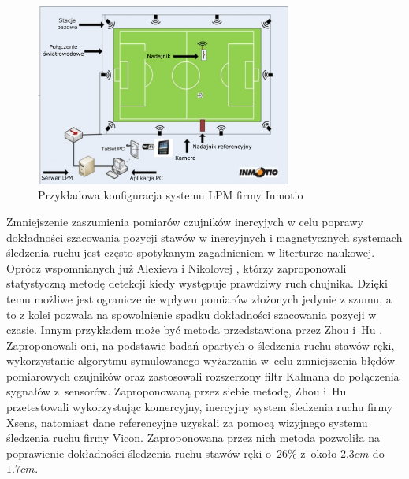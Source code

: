 \begin{savenotes}
	\begin{figure}[!htb]
		\centering	
		\includegraphics[width=0.75\textwidth]{images/lpm.png}
		\caption[Przykładowa konfiguracja systemu LPM firmy Inmotio]{Przykładowa konfiguracja systemu LPM firmy Inmotio}	
		\label{fig:literature:footnote:inmotio:setup}	
	\end{figure}
\end{savenotes}

Zmniejszenie zaszumienia pomiarów czujników inercyjych w celu poprawy dokładności szacowania pozycji stawów w inercyjnych i magnetycznych systemach śledzenia ruchu jest często spotykanym zagadnieniem w literturze naukowej. Oprócz wspomnianych już Alexieva i Nikolovej \cite{Alexiev2013}, którzy zaproponowali statystyczną metodę detekcji kiedy występuje prawdziwy ruch chujnika. Dzięki temu możliwe jest ograniczenie wpływu pomiarów złożonych jedynie z szumu, a to z kolei pozwala na spowolnienie spadku dokładności szacowania pozycji w czasie. Innym przykładem może być metoda przedstawiona przez Zhou i~Hu \cite{Zhou2005,Zhou2006}. Zaproponowali oni, na podstawie badań opartych o śledzenia ruchu stawów ręki, wykorzystanie algorytmu symulowanego wyżarzania w~celu zmniejszenia błędów pomiarowych czujników oraz zastosowali rozszerzony filtr Kalmana do połączenia sygnałów z~sensorów. Zaproponowaną przez siebie metodę, Zhou i~Hu przetestowali wykorzystując komercyjny, inercyjny system śledzenia ruchu firmy Xsens, natomiast dane referencyjne uzyskali za pomocą wizyjnego systemu śledzenia ruchu firmy Vicon. Zaproponowana przez nich metoda pozwoliła na poprawienie dokładności śledzenia ruchu stawów ręki o~$26\%$ z~około $2.3 cm$ do $1.7 cm$.
							
